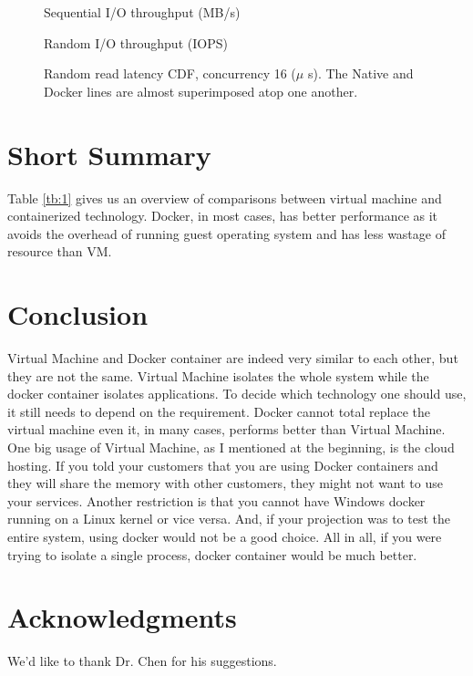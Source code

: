 \documentclass{sig-alternate}
\begin{document}
\begin{figure}[htb]
\centering
{}
\caption{Sequential I/O throughput (MB/s)\cite{vdcp:fel}}
\label{fig:io_seq}
\vskip -6pt
\end{figure}

\begin{figure}[htb]
\centering
{}
\caption{Random I/O throughput (IOPS)\cite{vdcp:fel}}
\label{fig:io_rd}
\vskip -6pt
\end{figure}

\begin{figure}[htb]
\centering
{}
\caption{Random read latency CDF, concurrency 16 ($\mu$ s). The Native and Docker lines are almost superimposed atop one another.\cite{vdcp:fel}}
\label{fig:rd_read}
\vskip -6pt
\end{figure}

\section{Short Summary}
Table \ref{tb:1} gives us an overview of comparisons between virtual machine and containerized technology. Docker, in most cases, has better performance as it avoids the overhead of running guest operating system and has less wastage of resource than VM.

\section{Conclusion}
Virtual Machine and Docker container are indeed very similar to each other, but they are not the same. Virtual Machine isolates the whole system while the docker container isolates applications. To decide which technology one should use, it still needs to depend on the requirement. Docker cannot total replace the virtual machine even it, in many cases, performs better than Virtual Machine. One big usage of Virtual Machine, as I mentioned at the beginning, is the cloud hosting. If you told your customers that you are using Docker containers and they will share the memory with other customers, they might not want to use your services. Another restriction is that you cannot have Windows docker running on a Linux kernel or vice versa. And, if your projection was to test the entire system, using docker would not be a good choice. All in all, if you were trying to isolate a single process, docker container would be much better.

\section{Acknowledgments} 
We'd like to thank Dr. Chen for his suggestions.
%

%
%
\end{document}
